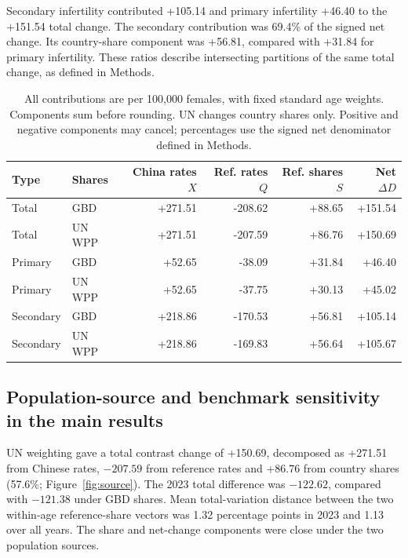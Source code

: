 \documentclass[11pt,a4paper]{article}
\begin{document}
Secondary infertility contributed +105.14 and primary infertility +46.40 to the +151.54 total change. The secondary contribution was 69.4\% of the signed net change. Its country-share component was +56.81, compared with +31.84 for primary infertility. These ratios describe intersecting partitions of the same total change, as defined in Methods.

\begin{table}[htbp]\centering\small{}
\caption{Symmetric PCOS contrast-change decomposition, 1990--2023, by population source.}\label{tab:decomp}
\setlength{\tabcolsep}{4pt}
\begin{tabular}{llrrrr}\toprule
Type & Shares & China rates $X$ & Ref. rates $Q$ & Ref. shares $S$ & Net $\Delta D$\\\midrule
Total & GBD & +271.51 & -208.62 & +88.65 & +151.54\\
Total & UN WPP & +271.51 & -207.59 & +86.76 & +150.69\\
Primary & GBD & +52.65 & -38.09 & +31.84 & +46.40\\
Primary & UN WPP & +52.65 & -37.75 & +30.13 & +45.02\\
Secondary & GBD & +218.86 & -170.53 & +56.81 & +105.14\\
Secondary & UN WPP & +218.86 & -169.83 & +56.64 & +105.67\\
\bottomrule
\end{tabular}
\caption*{All contributions are per 100,000 females, with fixed standard age weights. Components sum before rounding. UN changes country shares only. Positive and negative components may cancel; percentages use the signed net denominator defined in Methods.}
\end{table}

\subsection{Population-source and benchmark sensitivity in the main results}
UN weighting gave a total contrast change of +150.69, decomposed as +271.51 from Chinese rates, $-207.59$ from reference rates and +86.76 from country shares (57.6\%; Figure~\ref{fig:source}). The 2023 total difference was $-122.62$, compared with $-121.38$ under GBD shares. Mean total-variation distance between the two within-age reference-share vectors was 1.32 percentage points in 2023 and 1.13 over all years. The share and net-change components were close under the two population sources.
\end{document}
